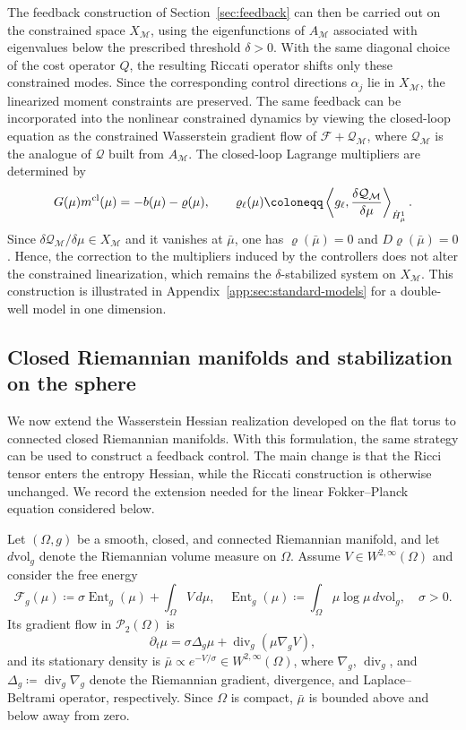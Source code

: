 \documentclass[11pt]{article}
\numberwithin{equation}{section}
\theoremstyle{definition}
\newcommand{\Pcal}{\mathcal{P}}
\newcommand{\F}{\mathcal{F}}
\newcommand{\Ent}{\operatorname{Ent}}
\newcommand{\vol}{\mathrm{vol}}
\newcommand{\potential}[1][\mu]{\dot{H}^1_{#1}}
\begin{document}
The feedback construction of Section~\ref{sec:feedback} can then be carried out on the constrained space $X_{\mathcal{M}}$, using the eigenfunctions of $A_{\mathcal{M}}$ associated with eigenvalues below the prescribed threshold $\delta > 0$. 
With the same diagonal choice of the cost operator $Q$, the resulting Riccati operator shifts only these constrained modes. 
Since the corresponding control directions $\alpha_j$ lie in $X_{\mathcal{M}}$, the linearized moment constraints are preserved. 
The same feedback can be incorporated into the nonlinear constrained dynamics by viewing the closed-loop equation as the constrained Wasserstein gradient flow of $\F + \mathcal{Q}_{\mathcal{M}}$, where $\mathcal{Q}_{\mathcal{M}}$ is the analogue of $\mathcal{Q}$ built from $A_{\mathcal{M}}$.
The closed-loop Lagrange multipliers are determined by
\[
G(\mu)m^{\rm cl}(\mu) = - b(\mu) - \varrho(\mu), \qquad \varrho_\ell(\mu) \coloneqq \left\langle g_\ell, \frac{\delta \mathcal{Q}_{\mathcal{M}}}{\delta \mu}\right\rangle_{\potential}.
\]
Since $\delta \mathcal{Q}_{\mathcal{M}} /\delta\mu \in X_{\mathcal{M}}$ and it vanishes at $\bar\mu$, one has $\varrho(\bar\mu) = 0$ and $D\varrho(\bar\mu) = 0$.
Hence, the correction to the multipliers induced by the controllers does not alter the constrained linearization, which remains the $\delta$-stabilized system on $X_{\mathcal{M}}$.
This construction is illustrated in Appendix~\ref{app:sec:standard-models} for a double-well model in one dimension.

\subsection{Closed Riemannian manifolds and stabilization on the sphere}
\label{sec:sphere-example}

We now extend the Wasserstein Hessian realization developed on the flat torus to connected closed Riemannian manifolds.
With this formulation, the same strategy can be used to construct a feedback control. 
The main change is that the Ricci tensor enters the entropy Hessian, while the Riccati construction is otherwise unchanged.
We record the extension needed for the linear Fokker--Planck equation considered below.

Let $(\Omega, g)$ be a smooth, closed, and connected Riemannian manifold, and let $d\vol_g$ denote the Riemannian volume measure on $\Omega$.
Assume $V \in W^{2,\infty}(\Omega)$ and consider the free energy 
\[
\F_g(\mu) \coloneqq \sigma\Ent_g(\mu) + \int_\Omega V \, d\mu, \quad \Ent_g(\mu) \coloneqq \int_\Omega \mu \log\mu \, d\vol_g, \quad \sigma > 0.
\]
Its gradient flow in $\Pcal_2(\Omega)$ is~\cite[Ex. 15.5]{villani2008optimal}
\begin{equation}
    \label{eq:manifold-FP}
    \partial_t\mu = \sigma\Delta_g\mu + \operatorname{div}_g(\mu\nabla_gV),
\end{equation}
and its stationary density is $\bar\mu \propto e^{-V/\sigma} \in W^{2,\infty}(\Omega)$, where $\nabla_g$, $\operatorname{div}_g$, and $\Delta_g \coloneqq \operatorname{div}_g \nabla_g$ denote the Riemannian gradient, divergence, and Laplace--Beltrami operator, respectively.
Since $\Omega$ is compact, $\bar\mu$ is bounded above and below away from zero.
\end{document}
